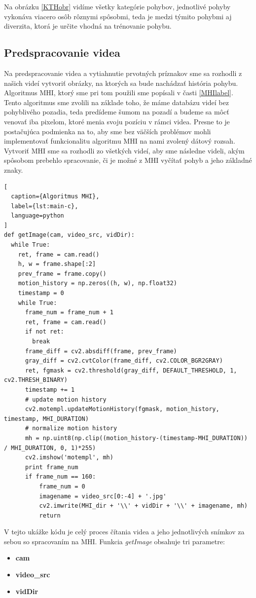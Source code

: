 Na obrázku \ref{KTHobr} vidíme všetky kategórie pohybov, jednotlivé pohyby vykonáva viacero osôb rôznymi spôsobmi, teda je medzi týmito pohybmi aj diverzita, ktorá je určite vhodná na trénovanie pohybu. 

\subsection{Predspracovanie videa}
Na predspracovanie videa a vytiahnutie prvotných príznakov sme sa rozhodli z našich videí vytvoriť obrázky, na ktorých sa bude nachádzať história pohybu. Algoritmus MHI, ktorý sme pri tom použili sme popísali v časti \ref{MHIlabel}. Tento algoritmus sme zvolili na základe toho, že máme databázu videí bez pohyblivého pozadia, teda predídeme šumom na pozadí a budeme sa môcť venovať iba pixelom, ktoré menia svoju pozíciu v rámci videa. Presne to je postačujúca podmienka na to, aby sme bez väčších problémov mohli implementovať funkcionalitu algoritmu MHI na nami zvolený dátový rozsah. Vytvoriť MHI sme sa rozhodli zo všetkých videí, aby sme následne videli, akým spôsobom prebehlo spracovanie, či je možné z MHI vyčítať pohyb a jeho základné znaky. 

\begin{lstlisting}[
  caption={Algoritmus MHI},
  label={lst:main-c},
  language=python
]
def getImage(cam, video_src, vidDir):
  while True:    
    ret, frame = cam.read()
    h, w = frame.shape[:2]
    prev_frame = frame.copy()
    motion_history = np.zeros((h, w), np.float32)
    timestamp = 0
    while True:
      frame_num = frame_num + 1
      ret, frame = cam.read()
      if not ret:
        break
      frame_diff = cv2.absdiff(frame, prev_frame)
      gray_diff = cv2.cvtColor(frame_diff, cv2.COLOR_BGR2GRAY)
      ret, fgmask = cv2.threshold(gray_diff, DEFAULT_THRESHOLD, 1, cv2.THRESH_BINARY)
      timestamp += 1
      # update motion history
      cv2.motempl.updateMotionHistory(fgmask, motion_history, timestamp, MHI_DURATION)
      # normalize motion history
      mh = np.uint8(np.clip((motion_history-(timestamp-MHI_DURATION)) / MHI_DURATION, 0, 1)*255)
      cv2.imshow('motempl', mh)
      print frame_num
      if frame_num == 160:
          frame_num = 0
          imagename = video_src[0:-4] + '.jpg'
          cv2.imwrite(MHI_dir + '\\' + vidDir + '\\' + imagename, mh)
          return
\end{lstlisting}


V tejto ukážke kódu je celý proces čítania videa a jeho jednotlivých snímkov za sebou so spracovaním na MHI. Funkcia \textit{getImage} obsahuje tri parametre:
\begin{itemize}
\item \textbf{cam}
\item \textbf{video\_src}
\item \textbf{vidDir}
\end{itemize}

